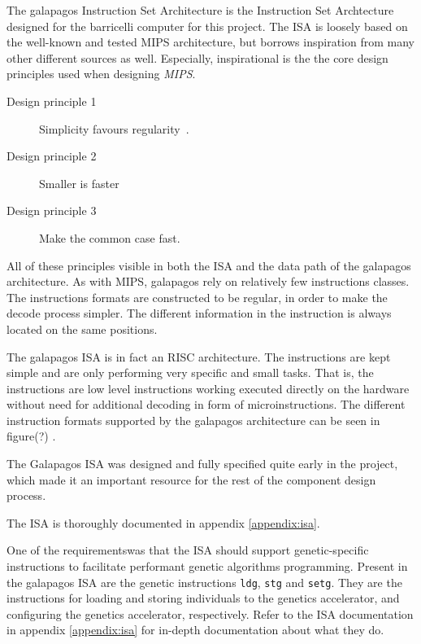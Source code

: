 The \Gls{galapagos} Instruction Set Architecture is the Instruction Set Archtecture designed for the \Gls{barricelli} computer for this project. The ISA is loosely based on the well-known and tested MIPS architecture\cn, but borrows inspiration from many other different sources as well. Especially, inspirational is the the core design principles used when designing \emph{MIPS}.

\begin{description}
  \item[Design principle 1] Simplicity favours regularity~\cite[p.~79]{compOrgDes}. 
  \item[Design principle 2] Smaller is faster ~\cite[p.~81]{compOrgDes}
  \item[Design principle 3] Make the common case fast.~\cite[p.~86]{compOrgDes}
\end{description}



All of these principles visible in both the ISA and the data path of the galapagos architecture. As with MIPS, galapagos rely on relatively few instructions classes. The instructions formats are constructed to be regular, in order to make the decode process simpler. The different information in the instruction is always located on the same positions.  


The galapagos ISA is in fact an RISC architecture. The instructions are kept simple and are only performing very specific and small tasks. That is, the instructions are low level instructions working executed directly on the hardware without need for additional decoding in form of microinstructions. The different instruction formats supported by the galapagos architecture can be seen in figure(?)  . 





The Galapagos ISA was designed and fully specified quite early in the project, which made it an important resource for the rest of the component design process.

The ISA is thoroughly documented in appendix \vref{appendix:isa}.

One of the requirements\cn was that the ISA should support genetic-specific instructions to facilitate performant genetic algorithms programming.
Present in the \Gls{galapagos} ISA are the genetic instructions \texttt{ldg}, \texttt{stg} and \texttt{setg}.
They are the instructions for loading and storing \glspl{individual} to the genetics accelerator, and configuring the genetics accelerator, respectively.
Refer to the ISA documentation in appendix \vref{appendix:isa} for in-depth documentation about what they do.

